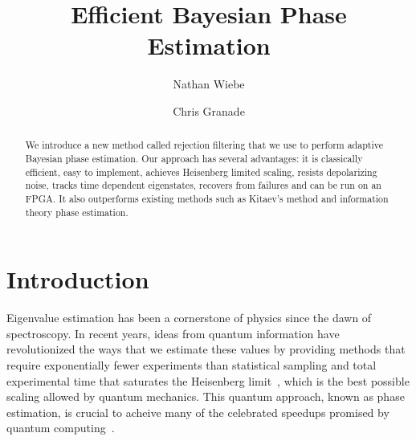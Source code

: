 \documentclass[aps,pra,amsmath,twocolumn,amssymb,superscriptaddress]{revtex4-1}
\begin{document}

\title{Efficient Bayesian Phase Estimation}
\author{Nathan Wiebe}

\author{Chris Granade}

\begin{abstract}
We introduce a new method called rejection filtering that we use to perform adaptive Bayesian phase estimation.  Our approach has several advantages: it is classically efficient, easy to implement, achieves Heisenberg limited scaling, resists depolarizing noise, tracks time dependent eigenstates, recovers from failures and can be run on an FPGA.  It also outperforms existing methods such as Kitaev's method and information theory phase estimation.
\end{abstract}

\maketitle

\section{Introduction}
\label{sec:intro}

Eigenvalue estimation has been a cornerstone of physics since the dawn of spectroscopy.  In recent years, ideas from quantum information have revolutionized the ways that we estimate these values by providing methods that require exponentially fewer experiments than statistical sampling and total experimental time that saturates the Heisenberg limit~\cite{Kit96,berry_optimal_2000,kitaev2002classical,higgins2007entanglement,BHB+09,GTA+06,hentschel_machine_2010,SHF14}, which is the best possible scaling allowed by quantum mechanics.  This quantum approach, known as phase estimation, is crucial to acheive many of the celebrated speedups promised by quantum computing~\cite{shor_polynomial-time_1995,BHM+02,ADL+05,harrow2009quantum,lanyon2010towards}.
\end{document}
